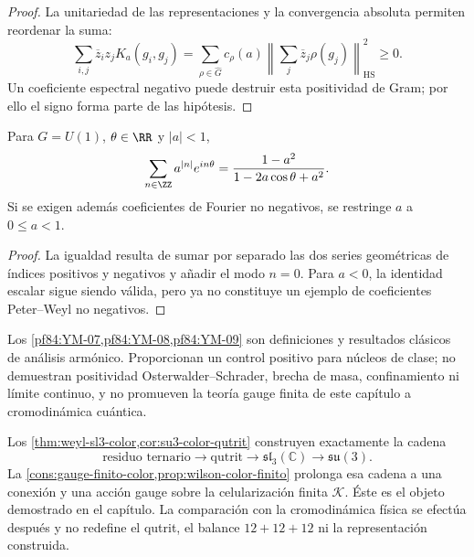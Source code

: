 \begin{proof}
La unitariedad de las representaciones y la convergencia absoluta permiten
reordenar la suma:
\[
 \sum_{i,j}\overline z_i z_jK_a(g_i,g_j)
 =
 \sum_{\rho\in\widehat G}
 c_\rho(a)
 \left\lVert
 \sum_j\overline z_j\rho(g_j)
 \right\rVert_{\mathrm{HS}}^2\ge0.
\]
Un coeficiente espectral negativo puede destruir esta positividad de Gram;
por ello el signo forma parte de las hipótesis.
\end{proof}

\begin{lemma}
\label{pf84:YM-09}
Para \(G=U(1)\), \(\theta\in\RR\) y \(|a|<1\),
\[
 \sum_{n\in\ZZ}a^{|n|}e^{in\theta}
 =\frac{1-a^2}{1-2a\cos\theta+a^2}.
\]
Si se exigen además coeficientes de Fourier no negativos, se restringe
\(a\) a \(0\le a<1\).
\end{lemma}

\begin{proof}
La igualdad resulta de sumar por separado las dos series geométricas de
índices positivos y negativos y añadir el modo \(n=0\). Para \(a<0\), la
identidad escalar sigue siendo válida, pero ya no constituye un ejemplo de
coeficientes Peter--Weyl no negativos.
\end{proof}

\begin{remark}
Los \cref{pf84:YM-07,pf84:YM-08,pf84:YM-09} son definiciones y resultados
clásicos de análisis armónico. Proporcionan un control positivo para
núcleos de clase; no demuestran positividad Osterwalder--Schrader, brecha de
masa, confinamiento ni límite continuo, y no promueven la teoría gauge
finita de este capítulo a cromodinámica cuántica.
\end{remark}

\begin{exactbox}[title={Cierre algebraico del color}]
Los \cref{thm:weyl-sl3-color,cor:su3-color-qutrit} construyen exactamente la
cadena
\[
\text{residuo ternario}\longrightarrow
\text{qutrit}\longrightarrow
\mathfrak{sl}_3(\mathbb C)\longrightarrow\mathfrak{su}(3).
\]
La \cref{cons:gauge-finito-color,prop:wilson-color-finito} prolonga esa
cadena a una conexión y una acción gauge sobre la celularización finita
\(\mathcal K\).  Éste es el objeto demostrado en el capítulo.  La
comparación con la cromodinámica física se efectúa después y no redefine el
qutrit, el balance \(12+12+12\) ni la representación construida.
\end{exactbox}
